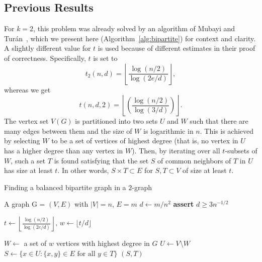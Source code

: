 \subsection{Previous Results}\label{subsec:previous-results}

For $k = 2$, this problem was already solved by an algorithm of Mubayi and Turán~\cite{MUBAYI2010174},
which we present here (Algorithm~\ref{alg:bipartite}) for context and clarity.
A slightly different value for $t$ is used because of different estimates in their proof of correctness.
Specifically, $t$ is set to
\[
    t_2(n, d) = \left\lfloor \frac{\log (n/2) }{\log (2e/d)}\right\rfloor,
\]
whereas we get
\[
    t(n, d, 2) = \left\lfloor
        \left(  \frac{\log (n/2)}{\log (3/d)} \right)
       \right\rfloor.
\]
The vertex set $V(G)$ is partitioned into two sets $U$ and $W$ such that there are many edges between them
and the size of $W$ is logarithmic in $n$.
This is achieved by selecting $W$ to be a set of vertices of highest degree
(that is, no vertex in $U$ has a higher degree than any vertex in $W$).
Then, by iterating over all $t$-subsets of $W$, such a set $T$
is found satisfying that the set $S$ of common neighbors of $T$ in $U$ has size at least $t$.
In other words, $S \times T \subset E$ for $S, T \subset V$ of size at least $t$.

\begin{algorithm}[H]
    \caption{Finding a balanced bipartite graph in a $2$-graph}
    \label{alg:bipartite}
        \begin{algorithmic}[1]
        \Require A graph G = $(V, E)$ with $|V| = n$, $E = m$
        \State $d \gets m / n^2 $
        \State \textbf{assert} $d \geq 3 n^{-1/2}$ \label{line:bipartite_min_d}

        \State $t \gets \left\lfloor\frac{\log (n/2) }
        {\log (2e/d)}\right\rfloor,\, w \gets \lfloor t/d \rfloor$

        \State $W \gets $ a set of $w$ vertices with highest degree in $G$
        \State $U \gets V \setminus W$
         \label{line:2partite_for}
            \State $S \gets \{x \in U \colon \{x, y\} \in E \text{ for all } y \in T\}$
                \State \Return $(S, T)$
            \EndIf
        \EndFor
        \end{algorithmic}
\end{algorithm}

